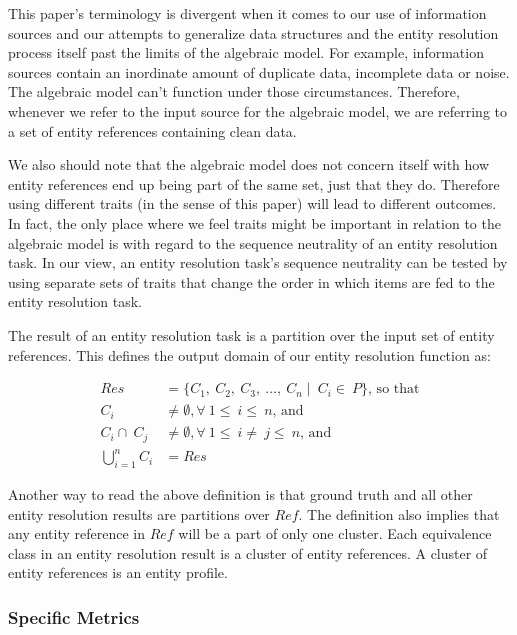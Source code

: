 \documentclass[journal]{IEEEtran}
\begin{document}
    This paper's terminology is divergent when it comes to our use of
    information sources and our attempts to generalize data structures and the
    entity resolution process itself past the limits of the algebraic model.
    For example, information sources contain an inordinate amount of duplicate
    data, incomplete data or noise.
    The algebraic model can't function under those circumstances.
    Therefore, whenever we refer to the input source for the algebraic model,
    we are referring to a set of entity references containing clean data.
    
    We also should note that the algebraic model does not concern itself with
    how entity references end up being part of the same set, just that they do.
    Therefore using different traits (in the sense of this paper) will lead to
    different outcomes.
    In fact, the only place where we feel traits might be important in relation
    to the algebraic model is with regard to the sequence neutrality of an
    entity resolution task.
    In our view, an entity resolution task's sequence neutrality can be tested
    by using separate sets of traits that change the order in which items are
    fed to the entity resolution task.

    The result of an entity resolution task is a partition over the input set of
    entity references.
    This defines the output domain of our entity resolution function as:

    \begin{align}
        Res &= \{C_1,~C_2,~C_3,~\ldots,~C_n\mid~C_i\in~P\}\textrm{, so that}\nonumber\\
        C_i&\neq\emptyset,\forall~1\leq~i\leq~n\textrm{,~and}\nonumber\\
        C_i\cap~C_j&\neq\emptyset,\forall~1\leq~i\neq~j\leq~n\textrm{,~and}\nonumber\\
        \bigcup_{i=1}^{n}C_i&=Res\nonumber
    \end{align}

    Another way to read the above definition is that ground truth and all other
    entity resolution results are partitions over $Ref$.
    The definition also implies that any entity reference in $Ref$ will be a
    part of only one cluster.
    Each equivalence class in an entity resolution result is a cluster of entity
    references.
    A cluster of entity references is an entity profile.

    \subsubsection[algeval]{Specific Metrics}\label{subsubsec:algeval}
\end{document}

